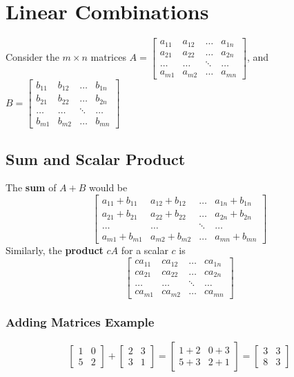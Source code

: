 \section{Linear Combinations}
Consider the $m \times n$ matrices $A = \begin{bmatrix}
    a_{11} & a_{12} & \dots & a_{1n} \\
    a_{21} & a_{22} & \dots & a_{2n} \\
    \dots & \dots & \ddots & \dots \\
    a_{m1} & a_{m2} & \dots & a_{mn}
  \end{bmatrix}$, and $B = \begin{bmatrix}
    b_{11} & b_{12} & \dots & b_{1n} \\
    b_{21} & b_{22} & \dots & b_{2n} \\
    \dots & \dots & \ddots & \dots \\
    b_{m1} & b_{m2} & \dots & b_{mn}
  \end{bmatrix}$
\subsection{Sum and Scalar Product}
The \textbf{sum} of $A + B$ would be 
\[
  \begin{bmatrix}
    a_{11} + b_{11} & a_{12} + b_{12} & \dots & a_{1n} + b_{1n} \\
    a_{21} + b_{21} & a_{22} + b_{22} & \dots & a_{2n} + b_{2n} \\
    \dots & \dots & \ddots & \dots \\
    a_{m1} + b_{m1} & a_{m2} + b_{m2} & \dots & a_{mn} + b_{mn}
  \end{bmatrix}
\] 
Similarly, the \textbf{product} $cA$ for a scalar $c$ is
\[
  \begin{bmatrix}
    ca_{11} & ca_{12} & \dots & ca_{1n} \\
    ca_{21} & ca_{22} & \dots & ca_{2n} \\
    \dots & \dots & \ddots & \dots \\
    ca_{m1} & ca_{m2} & \dots & ca_{mn}
  \end{bmatrix}
\]
\subsubsection{Adding Matrices Example}
\[
  \begin{bmatrix}
    1 & 0 \\
    5 & 2
  \end{bmatrix} + 
  \begin{bmatrix}
    2 & 3 \\
    3 & 1
  \end{bmatrix} =
  \begin{bmatrix}
    1 + 2 & 0 + 3 \\
    5 + 3 & 2 + 1
  \end{bmatrix} = 
  \begin{bmatrix}
    3 & 3 \\
    8 & 3
  \end{bmatrix}
\]
